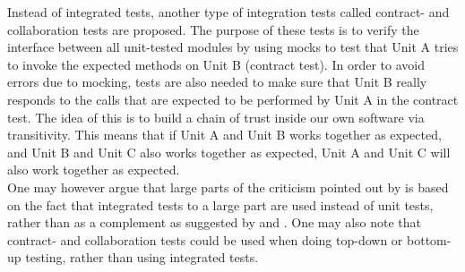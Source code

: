 Instead of integrated tests, another type of integration tests called
contract- and collaboration tests are proposed. The purpose of these
tests is to verify the interface between all unit-tested modules by
using mocks to test that Unit A tries to invoke the expected methods on
Unit B (contract test). In order to avoid errors due to mocking, tests
are also needed to make sure that Unit B really responds to the calls
that are expected to be performed by Unit A in the contract test. The
idea of this is to build a chain of trust inside our own software via
transitivity. This means that if Unit A and Unit B works together as
expected, and Unit B and Unit C also works together as expected, Unit A
and Unit C will also work together as expected.\\

One may however argue that large parts of the criticism pointed out by
\citeauthor{video:integrated_scam} is based on the fact that integrated
tests to a large part are used instead of unit tests, rather than as a
complement as suggested by \citeauthor{book:pfleeger} and
\citeauthor{book:adp}. One may also note that contract- and
collaboration tests could be used when doing top-down or bottom-up
testing, rather than using integrated tests.\\
